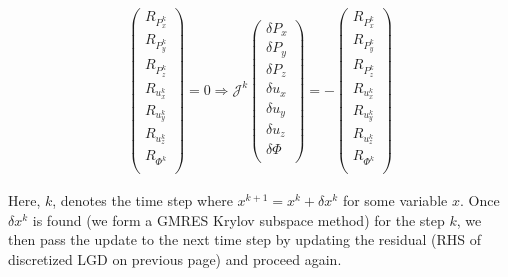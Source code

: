 \documentclass[16pt]{article} %
\begin{document}
\begin{align}\tag{959}
 \begin{pmatrix} R_{P_x^{k}}  \\
 R_{P_y^{k}}  \\
R_{P_z^{k} } \\
  R_{u_x^{k} } \\
R_{u_y^{k}}  \\
R_{u_z^{k} } \\
  R_{\Phi^{k}} \\
\end{pmatrix} = 0 \Rightarrow \mathscr{J}^k\begin{pmatrix}
  \delta P_x  \\
 \delta P_y \\
 \delta P_z  \\
  \delta u_x  \\
\delta u_y \\
\delta u_z \\
 \delta \Phi \\
 \end{pmatrix}= -  \begin{pmatrix} R_{P_x^{k}}  \\
 R_{P_y^{k}}  \\
R_{P_z^{k} } \\
  R_{u_x^{k} } \\
R_{u_y^{k}}  \\
R_{u_z^{k} } \\
  R_{\Phi^{k}} \\
\end{pmatrix}
\end{align}

Here, $k$, denotes the time step where $x^{k+1} = x^k + \delta x^k$ for some variable $x$. Once $\delta x^k$ is found (we form a GMRES Krylov subspace method) for the step $k$, we then pass the update to the next time step by updating the residual (RHS of discretized LGD on previous page) and proceed again.

\end{document}
